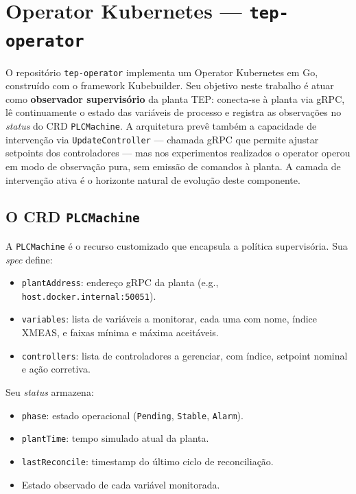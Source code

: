 \section{Operator Kubernetes — \texttt{tep-operator}}
\label{sec:operator}

O repositório \texttt{tep-operator} implementa um Operator Kubernetes em Go, construído com o framework Kubebuilder. Seu objetivo neste trabalho é atuar como \textbf{observador supervisório} da planta TEP: conecta-se à planta via gRPC, lê continuamente o estado das variáveis de processo e registra as observações no \textit{status} do CRD \texttt{PLCMachine}. A arquitetura prevê também a capacidade de intervenção via \texttt{UpdateController} — chamada gRPC que permite ajustar setpoints dos controladores — mas nos experimentos realizados o operator operou em modo de observação pura, sem emissão de comandos à planta. A camada de intervenção ativa é o horizonte natural de evolução deste componente.

\subsection{O CRD \texttt{PLCMachine}}

A \texttt{PLCMachine} é o recurso customizado que encapsula a política supervisória. Sua \textit{spec} define:

\begin{itemize}
  \item \texttt{plantAddress}: endereço gRPC da planta (e.g., \texttt{host.docker.internal:50051}).
  \item \texttt{variables}: lista de variáveis a monitorar, cada uma com nome, índice XMEAS, e faixas mínima e máxima aceitáveis.
  \item \texttt{controllers}: lista de controladores a gerenciar, com índice, setpoint nominal e ação corretiva.
\end{itemize}

Seu \textit{status} armazena:

\begin{itemize}
  \item \texttt{phase}: estado operacional (\texttt{Pending}, \texttt{Stable}, \texttt{Alarm}).
  \item \texttt{plantTime}: tempo simulado atual da planta.
  \item \texttt{lastReconcile}: timestamp do último ciclo de reconciliação.
  \item Estado observado de cada variável monitorada.
\end{itemize}

